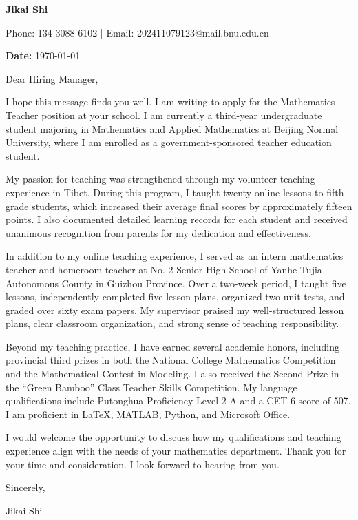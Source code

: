 \documentclass[12pt]{article}
\begin{document}
	
	\vspace*{-0.5cm}
	{\large \textbf{Jikai Shi}}
	
	\vspace{0.2cm}
	Phone: 134-3088-6102 \;|\; Email: 202411079123@mail.bnu.edu.cn
	
	\vspace{0.5cm}
	\textbf{Date:} \today
	
	\vspace{0.5cm}
	Dear Hiring Manager,
	
	\vspace{0.2cm}
	I hope this message finds you well. I am writing to apply for the Mathematics Teacher position at your school. I am currently a third-year undergraduate student majoring in Mathematics and Applied Mathematics at Beijing Normal University, where I am enrolled as a government-sponsored teacher education student.
	
	\vspace{0.2cm}
	My passion for teaching was strengthened through my volunteer teaching experience in Tibet. During this program, I taught twenty online lessons to fifth-grade students, which increased their average final scores by approximately fifteen points. I also documented detailed learning records for each student and received unanimous recognition from parents for my dedication and effectiveness.
	
	\vspace{0.2cm}
	In addition to my online teaching experience, I served as an intern mathematics teacher and homeroom teacher at No. 2 Senior High School of Yanhe Tujia Autonomous County in Guizhou Province. Over a two-week period, I taught five lessons, independently completed five lesson plans, organized two unit tests, and graded over sixty exam papers. My supervisor praised my well-structured lesson plans, clear classroom organization, and strong sense of teaching responsibility.
	
	\vspace{0.2cm}
	Beyond my teaching practice, I have earned several academic honors, including provincial third prizes in both the National College Mathematics Competition and the Mathematical Contest in Modeling. I also received the Second Prize in the “Green Bamboo” Class Teacher Skills Competition. My language qualifications include Putonghua Proficiency Level 2-A and a CET-6 score of 507. I am proficient in LaTeX, MATLAB, Python, and Microsoft Office.
	
	\vspace{0.2cm}
	I would welcome the opportunity to discuss how my qualifications and teaching experience align with the needs of your mathematics department. Thank you for your time and consideration. I look forward to hearing from you.
	
	\vspace{0.5cm}
	Sincerely,
	
	\vspace{0.5cm}
	Jikai Shi
	
\end{document}
